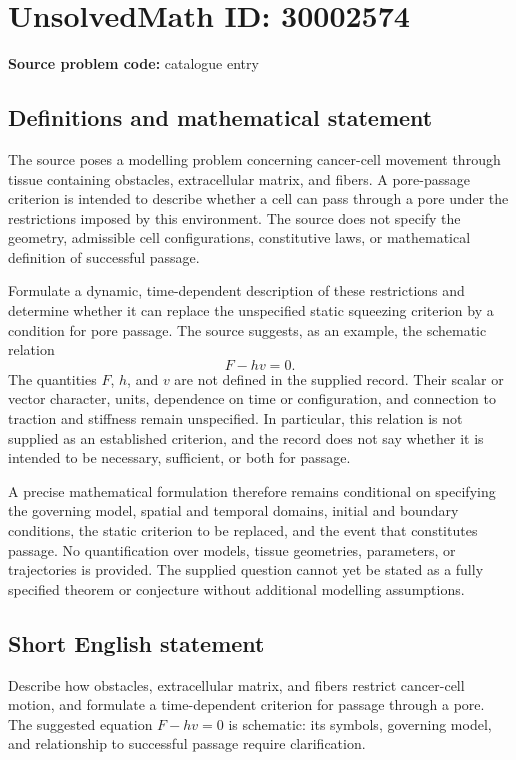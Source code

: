 \documentclass[11pt]{article}
\begin{document}
\section*{UnsolvedMath ID: 30002574}
\textbf{Source problem code:} catalogue entry
\subsection{Definitions and mathematical statement}
The source poses a modelling problem concerning cancer-cell movement through tissue containing obstacles, extracellular matrix, and fibers. A pore-passage criterion is intended to describe whether a cell can pass through a pore under the restrictions imposed by this environment. The source does not specify the geometry, admissible cell configurations, constitutive laws, or mathematical definition of successful passage.

Formulate a dynamic, time-dependent description of these restrictions and determine whether it can replace the unspecified static squeezing criterion by a condition for pore passage. The source suggests, as an example, the schematic relation
\[
F-hv=0.
\]
The quantities \(F\), \(h\), and \(v\) are not defined in the supplied record. Their scalar or vector character, units, dependence on time or configuration, and connection to traction and stiffness remain unspecified. In particular, this relation is not supplied as an established criterion, and the record does not say whether it is intended to be necessary, sufficient, or both for passage.

A precise mathematical formulation therefore remains conditional on specifying the governing model, spatial and temporal domains, initial and boundary conditions, the static criterion to be replaced, and the event that constitutes passage. No quantification over models, tissue geometries, parameters, or trajectories is provided. The supplied question cannot yet be stated as a fully specified theorem or conjecture without additional modelling assumptions.
\subsection{Short English statement}
Describe how obstacles, extracellular matrix, and fibers restrict cancer-cell motion, and formulate a time-dependent criterion for passage through a pore. The suggested equation \(F-hv=0\) is schematic: its symbols, governing model, and relationship to successful passage require clarification.
\end{document}
